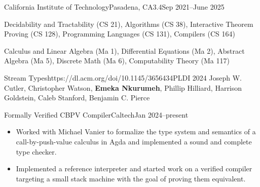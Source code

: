 \documentclass[a4paper,10pt]{article}
\begin{document}

    \begin{school}{California Institute of Technology}{Pasadena, CA}{3.4}{Sep 2021--June 2025}


        \item Decidability and Tractability (CS 21), Algorithms (CS 38), Interactive Theorem Proving (CS 128), Programming Languages (CS 131), Compilers (CS 164)
        \item Calculus and Linear Algebra (Ma 1), Differential Equations (Ma 2), Abstract Algebra (Ma 5), Discrete Math (Ma 6), Computability Theory (Ma 117)

    \end{school}

    \begin{publication}{Stream Types}{https://dl.acm.org/doi/10.1145/3656434}{PLDI 2024}
      Joseph W. Cutler, Christopher Watson, \textbf{Emeka Nkurumeh}, Phillip Hilliard, Harrison Goldstein, Caleb Stanford, Benjamin C. Pierce
    \end{publication}

    \begin{activity*}{Formally Verified CBPV Compiler}{Caltech}{Jan 2024--present}
      \begin{itemize}[topsep=4pt, partopsep=0pt, itemsep=-2pt]
        \item Worked with Michael Vanier to formalize the type system and semantics of a call-by-push-value calculus in Agda and implemented a sound and complete type checker.
        \item Implemented a reference interpreter and started work on a verified compiler targeting a small stack machine with the goal of proving them equivalent.
      \end{itemize}
    \end{activity*}
\end{document}

